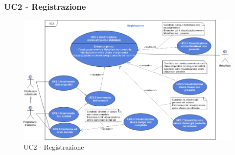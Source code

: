 \subsubsection{UC2 - Registrazione}
\begin{figure}[h]
	\includegraphics[width=16cm]{res/images/UC2Registrazione.png}
	\centering
	\caption{UC2 - Registrazione}
\end{figure}
